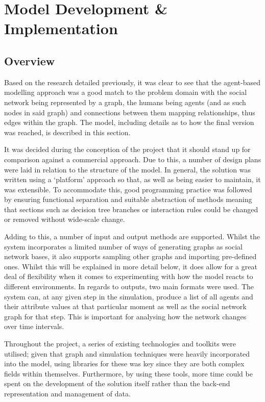 \documentclass[]{report}
\begin{document}
%
%

%
%
\chapter{Model Development \& Implementation}
\label{sec:dev}
\section{Overview}
Based on the research detailed previously, it was clear to see that the agent-based modelling approach was a good match to the problem domain with the social network being represented by a graph, the humans being agents (and as such nodes in said graph) and connections between them mapping relationships, thus edges within the graph. The model, including details as to how the final version was reached, is described in this section.

It was decided during the conception of the project that it should stand up for comparison against a commercial approach. Due to this, a number of design plans were laid in relation to the structure of the model. In general, the solution was written using a `platform' approach so that, as well as being easier to maintain, it was extensible. To accommodate this, good programming practice was followed by ensuring functional separation and suitable abstraction of methods meaning that sections such as decision tree branches or interaction rules could be changed or removed without wide-scale change.

Adding to this, a number of input and output methods are supported. Whilst the system incorporates a limited number of ways of generating graphs as social network bases, it also supports sampling other graphs and importing pre-defined ones. Whilst this will be explained in more detail below, it does allow for a great deal of flexibility when it comes to experimenting with how the model reacts to different environments. In regards to outputs, two main formats were used. The system can, at any given step in the simulation, produce a list of all agents and their attribute values at that particular moment as well as the social network graph for that step. This is important for analysing how the network changes over time intervals.

Throughout the project, a series of existing technologies and toolkits were utilised; given that graph and simulation techniques were heavily incorporated into the model, using libraries for these was key since they are both complex fields within themselves. Furthermore, by using these tools, more time could be spent on the development of the solution itself rather than the back-end representation and management of data.
\end{document}
